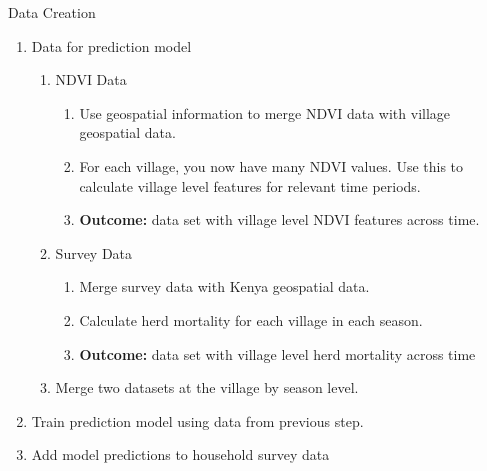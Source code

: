 \documentclass{beamer}
\begin{document}
\begin{frame}{Data Creation}
\begin{enumerate}
   \item Data for prediction model
   \begin{enumerate}
       \item NDVI Data
       \begin{enumerate}
           \item Use geospatial information to merge NDVI data with village geospatial data. 
           \item For each village, you now have many NDVI values. Use this to calculate village level features for relevant time periods. 
           \item \textbf{Outcome:} data set with village level NDVI features across time.
       \end{enumerate}
       \item Survey Data
       \begin{enumerate}
           \item Merge survey data with Kenya geospatial data. 
           \item Calculate herd mortality for each village in each season. 
           \item \textbf{Outcome:} data set with village level herd mortality across time
       \end{enumerate}
       \item Merge two datasets at the village by season level.
   \end{enumerate}
   \item Train prediction model using data from previous step. 
    \item Add model predictions to household survey data 
\end{enumerate}
\end{frame}
\end{document}
